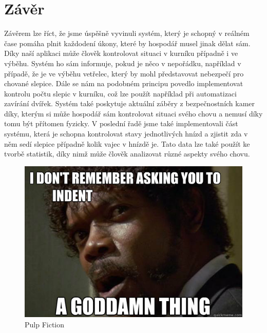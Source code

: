 ﻿\newpage
\chapter{Závěr}
Závěrem lze říct, že jsme úspěšně vyvinuli systém, který je schopný v reálném čase pomáha plnit každodení úkony, které by hospodář musel jinak dělat sám.
Díky naší aplikaci může člověk kontrolovat situaci v kurníku případně i ve výběhu.
Systém ho sám informuje, pokud je něco v nepořádku, například v případě, že je ve výběhu vetřelec, který by mohl představovat nebezpečí pro chované slepice.
Dále se nám na podobném principu povedlo implementovat kontrolu počtu slepic v kurníku, což lze použít například při automatizaci zavírání dvířek.
Systém také poskytuje aktuální záběry z bezpečnostních kamer díky, kterým si může hospodář sám kontrolovat situaci svého chovu a nemusí díky tomu být přítomen fyzicky.
V poslední řadě jsme také implementovali část systému, která je schopna kontrolovat stavy jednotlivých hnízd a zjistit zda v něm sedí slepice případně kolik vajec v hnízdě je.
Tato data lze také použít ke tvorbě statistik, díky nimž může člověk analizovat různé aspekty svého chovu.

\begin{figure}[h]
    \centering
    \includegraphics[width=\textwidth]{img/pulp}
    \caption{Pulp Fiction}
    \label{fig:pulp-fiction}
\end{figure}

